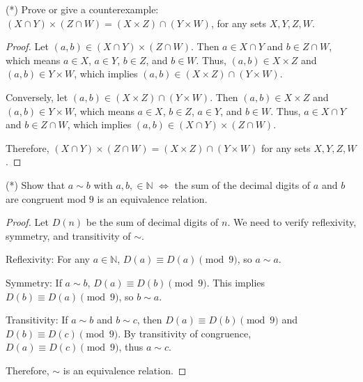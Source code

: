 \documentclass[12pt]{article}
\begin{document}
\begin{problem}
(*) Prove or give a counterexample: $(X \cap Y) \times (Z \cap W) = (X \times Z) \cap (Y \times W)$, for any sets $X,Y,Z,W$.

\begin{proof}
Let $(a,b) \in (X \cap Y) \times (Z \cap W)$. Then $a \in X \cap Y$ and $b \in Z \cap W$, which means $a \in X$, $a \in Y$, $b \in Z$, and $b \in W$. Thus, $(a,b) \in X \times Z$ and $(a,b) \in Y \times W$, which implies $(a,b) \in (X \times Z) \cap (Y \times W)$.

Conversely, let $(a,b) \in (X \times Z) \cap (Y \times W)$. Then $(a,b) \in X \times Z$ and $(a,b) \in Y \times W$, which means $a \in X$, $b \in Z$, $a \in Y$, and $b \in W$. Thus, $a \in X \cap Y$ and $b \in Z \cap W$, which implies $(a,b) \in (X \cap Y) \times (Z \cap W)$.

Therefore, $(X \cap Y) \times (Z \cap W) = (X \times Z) \cap (Y \times W)$ for any sets $X,Y,Z,W$.
\end{proof}
\end{problem}

\begin{problem}
(*) Show that $a \sim b$ with $a,b, \in \mathbb{N}$ $\iff$ the sum of the decimal digits of $a$ and $b$ are congruent mod $9$ is an equivalence relation.

\begin{proof}
Let $D(n)$ be the sum of decimal digits of $n$. We need to verify reflexivity, symmetry, and transitivity of $\sim$.

Reflexivity: For any $a \in \mathbb{N}$, $D(a) \equiv D(a) \pmod{9}$, so $a \sim a$.

Symmetry: If $a \sim b$, $D(a) \equiv D(b) \pmod{9}$. This implies $D(b) \equiv D(a) \pmod{9}$, so $b \sim a$.

Transitivity: If $a \sim b$ and $b \sim c$, then $D(a) \equiv D(b) \pmod{9}$ and $D(b) \equiv D(c) \pmod{9}$. By transitivity of congruence, $D(a) \equiv D(c) \pmod{9}$, thus $a \sim c$.

Therefore, $\sim$ is an equivalence relation.
\end{proof}
\end{problem}
\end{document}
